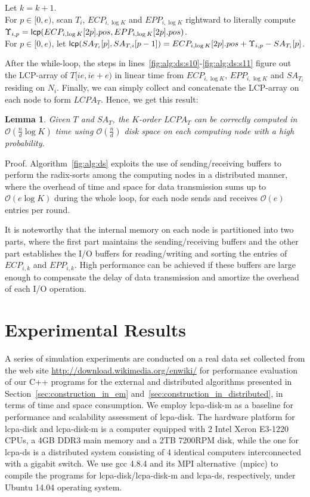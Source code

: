 \documentclass{llncs}
\newtheorem{Lemma}{Lemma}
\begin{document}
\begin{algorithm}[t!]
{{		Let $k=k+1$. \\
	}
	For $p\in [0,e)$, scan $T_i$, $ECP_{i,\log K}$ and $EPP_{i,\log K}$ rightward to literally compute $\Upsilon_{i,p}={\sf lcp}(ECP_{i,\log K}[2p].pos,EPP_{i,\log K}[2p].pos)$. \label{fig:alg:ds:s10}\\
	For $p\in [0,e)$, let ${\sf lcp}(SA_{T_i}[p],SA_{T,i}[p-1])=ECP_{i,\log K}[2p].pos + \Upsilon_{i,p} - SA_{T_i}[p]$. \label{fig:alg:ds:s11}\\
}
\end{algorithm}


After the while-loop, the steps in lines~\ref{fig:alg:ds:s10}-\ref{fig:alg:ds:s11} figure out the LCP-array of $T[ie,ie+e)$ in linear time from $ECP_{i,{\log K}}$, $EPP_{i,{\log K}}$ and $SA_{T_i}$ residing on $N_i$. Finally, we can simply collect and concatenate the LCP-array on each node to form $LCPA_T$. Hence, we get this result:

\begin{Lemma}
\label{thm:lcp:pdm}
Given $T$ and $SA_T$, the $K$-order $LCPA_T$ can be correctly computed in $\mathcal{O}(\frac{n}{d}\log K)$ time using $\mathcal{O}(\frac{n}{d})$ disk space on each computing node with a high probability.
\end{Lemma}
Proof. Algorithm~\ref{fig:alg:ds} exploits the use of sending/receiving buffers to perform the radix-sorts among the computing nodes in a distributed manner, where the overhead of time and space for data transmission sums up to $\mathcal{O}(e\log K)$ during the whole loop, for each node sends and receives $\mathcal{O}(e)$ entries per round.


It is noteworthy that the internal memory on each node is partitioned into two parts, where the first part maintains the sending/receiving buffers and the other part establishes the I/O buffers for reading/writing and sorting the entries of $ECP_{i,k}$ and $EPP_{i,k}$. High performance can be achieved if these buffers are large enough to compensate the delay of data transmission and amortize the overhead of each I/O operation.

\section{Experimental Results}\label{sec:experimental_results}

A series of simulation experiments are conducted on a real data set collected from the web site \url{http://download.wikimedia.org/enwiki/} for performance evaluation of our {C++} programs for the external and distributed algorithms presented in Section~\ref{sec:construction_in_em} and~\ref{sec:construction_in_distributed}, in terms of time and space consumption. We employ lcpa-disk-m as a baseline for performance and scalability assessment of lcpa-disk. The hardware platform for lcpa-disk and lcpa-disk-m is a computer equipped with 2 Intel Xeron E3-1220 CPUs, a 4GB DDR3 main memory and a 2TB 7200RPM disk, while the one for lcpa-ds is a distributed system consisting of 4 identical computers interconnected with a gigabit switch. We use gcc 4.8.4 and its MPI alternative~(mpicc) to compile the programs for lcpa-disk/lcpa-disk-m and lcpa-ds, respectively, under Ubuntu 14.04 operating system.
\end{document}
